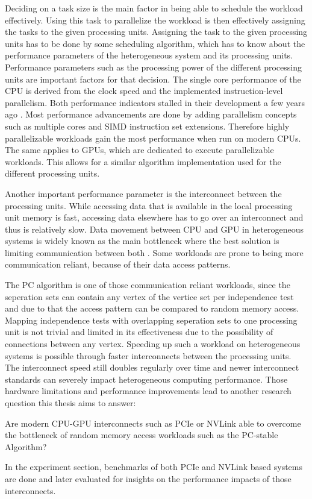 Deciding on a task size is the main factor in being able to schedule the workload effectively. Using this task to parallelize the workload is then effectively assigning the tasks to the given processing units. Assigning the task to the given processing units has to be done by some scheduling algorithm, which has to know about the performance parameters of the heterogeneous system and its processing units.
Performance parameters such as the processing power of the different processing units are important factors for that decision. The single core performance of the CPU is derived from the clock speed and the implemented instruction-level parallelism. Both performance indicators stalled in their development a few years ago \cite{sutterFreeLunchFundamental2013}. Most performance advancements are done by adding parallelism concepts such as multiple cores and SIMD instruction set extensions. Therefore highly parallelizable workloads gain the most performance when run on modern CPUs. The same applies to GPUs, which are dedicated to execute parallelizable workloads.
This allows for a similar algorithm implementation used for the different processing units.

Another important performance parameter is the interconnect between the processing units. While accessing data that is available in the local processing unit memory is fast, accessing data elsewhere has to go over an interconnect and thus is relatively slow. Data movement between CPU and GPU in heterogeneous systems is widely known as the main bottleneck where the best solution is limiting communication between both \cite{hazarikaSurveyMemoryManagement2019}. Some workloads are prone to being more communication reliant, because of their data access patterns.

The PC algorithm is one of those communication reliant workloads, since the seperation sets can contain any vertex of the vertice set per independence test and due to that the access pattern can be compared to random memory access. Mapping independence tests with overlapping seperation sets to one processing unit is not trivial and limited in its effectiveness due to the possibility of connections between any vertex. Speeding up such a workload on heterogeneous systems is possible through faster interconnects between the processing units. The interconnect speed still doubles regularly over time \cite{NVLink2021} and newer interconnect standards can severely impact heterogeneous computing performance.
Those hardware limitations and performance improvements lead to another research question this thesis aims to answer:

Are modern CPU-GPU interconnects such as PCIe or NVLink able to overcome the bottleneck of random memory access workloads such as the PC-stable Algorithm?

In the experiment section, benchmarks of both PCIe and NVLink based systems are done and later evaluated for insights on the performance impacts of those interconnects.

